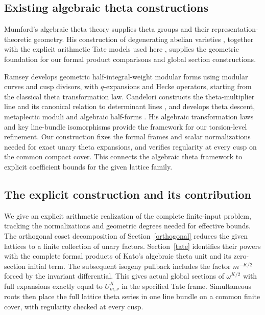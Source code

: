 \documentclass[11pt]{article}
\theoremstyle{remark}\newtheorem{remark}[theorem]{Remark}
\begin{document}
\subsection{Existing algebraic theta constructions}
Mumford's algebraic theta theory \cite{mumford-theta} supplies theta groups
and their representation-theoretic geometry. His construction of degenerating
abelian varieties \cite{mumford}, together with the explicit arithmetic
Tate models used here \cite{conrad}, supplies the geometric foundation for
our formal product comparisons and global section constructions.

Ramsey \cite{ramsey} develops geometric half-integral-weight modular forms
using modular curves and cusp divisors, with $q$-expansions and Hecke
operators, starting from the classical theta transformation law.
Candelori constructs the theta-multiplier line and its
canonical relation to determinant lines \cite{candelori-key}, and develops
theta descent, metaplectic moduli and algebraic half-forms
\cite{candelori}. His algebraic transformation laws and key line-bundle
isomorphisms provide the framework for our torsion-level refinement.
Our construction fixes the formal frames and scalar normalizations needed
for exact unary theta expansions, and verifies regularity at every cusp
on the common compact cover. This connects the algebraic theta framework
to explicit coefficient bounds for the given lattice family.

\subsection{The explicit construction and its contribution}
We give an explicit arithmetic realization of the complete finite-input
problem, tracking the normalizations and geometric degrees needed for
effective bounds. The orthogonal coset decomposition of Section~\ref{orthogonal}
reduces the given lattices to a finite collection of unary factors.
Section~\ref{tate} identifies their powers with the complete formal products
of Kato's algebraic theta unit \cite{kato,klz} and its zero-section initial
term. The subsequent isogeny pullback includes the factor $m^{-K/2}$ forced
by the invariant differential. This gives actual global sections of
$\omega^{K/2}$ with full expansions exactly equal to $U_{m,\nu}^{K}$
in the specified Tate frame.
Simultaneous roots then place the full lattice theta series in one line
bundle on a common finite cover, with regularity checked at every cusp.
\end{document}
